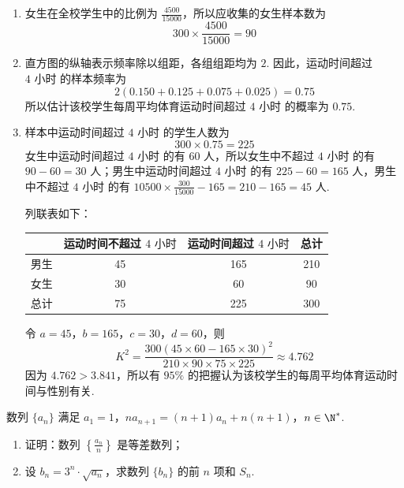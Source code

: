 \begin{solution}
\begin{enumerate}
\item 女生在全校学生中的比例为 \(\frac{4500}{15000}\)，所以应收集的女生样本数为
\[
300\times\frac{4500}{15000}=90
\]

\item 直方图的纵轴表示频率除以组距，各组组距均为 \(2\). 因此，运动时间超过 \(4\text{ 小时}\) 的样本频率为
\[
2\left(0.150+0.125+0.075+0.025\right)=0.75
\]
所以估计该校学生每周平均体育运动时间超过 \(4\text{ 小时}\) 的概率为 \(0.75\).

\item 样本中运动时间超过 \(4\text{ 小时}\) 的学生人数为
\[
300\times0.75=225
\]
女生中运动时间超过 \(4\text{ 小时}\) 的有 \(60\) 人，所以女生中不超过 \(4\text{ 小时}\) 的有 \(90-60=30\) 人；男生中运动时间超过 \(4\text{ 小时}\) 的有 \(225-60=165\) 人，男生中不超过 \(4\text{ 小时}\) 的有 \(10500\times\frac{300}{15000}-165=210-165=45\) 人.

列联表如下：

\begin{center}
\begin{tabular}{c|cc|c}
 & 运动时间不超过 \(4\text{ 小时}\) & 运动时间超过 \(4\text{ 小时}\) & 总计 \\
\hline
男生 & 45 & 165 & 210 \\
女生 & 30 & 60 & 90 \\
\hline
总计 & 75 & 225 & 300
\end{tabular}
\end{center}

令 \(a=45\)，\(b=165\)，\(c=30\)，\(d=60\)，则
\[
K^2=\frac{300(45\times60-165\times30)^2}{210\times90\times75\times225}\approx4.762
\]
因为 \(4.762>3.841\)，所以有 \(95\%\) 的把握认为该校学生的每周平均体育运动时间与性别有关.
\end{enumerate}
\end{solution}

\begin{problem}
数列 \(\{a_{n}\}\) 满足 \(a_1 = 1\)，\(na_{n+1} = (n + 1)a_n + n(n + 1)\)，\(n \in \N^*\).

\begin{enumerate}
\item 证明：数列 \(\left\{\frac{a_{n}}{n}\right\}\) 是等差数列；
\item 设 \(b_n = 3^n \cdot \sqrt{a_n}\)，求数列 \(\{b_n\}\) 的前 \(n\) 项和 \(S_n\).
\end{enumerate}
\end{problem}

